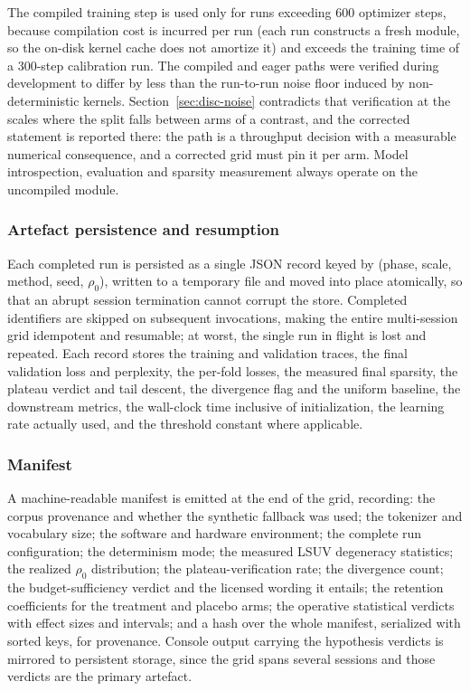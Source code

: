 \documentclass[final,5p,times,twocolumn]{elsarticle}
\theoremstyle{remark}
\newcommand{\rhoz}{\rho_{0}}
\begin{document}
The compiled training step is used only for runs exceeding $600$ optimizer
steps, because compilation cost is incurred per run (each run constructs a
fresh module, so the on-disk kernel cache does not amortize it) and exceeds the
training time of a $300$-step calibration run. The compiled and eager paths were
verified during development to differ by less than the run-to-run noise
floor induced by non-deterministic kernels. Section~\ref{sec:disc-noise}
contradicts that verification at the scales where the split falls between arms
of a contrast, and the corrected statement is reported there: the path is a
throughput decision with a measurable numerical consequence, and a corrected
grid must pin it per arm. Model introspection, evaluation and sparsity measurement always
operate on the uncompiled module.

\subsubsection{Artefact persistence and resumption}

Each completed run is persisted as a single JSON record keyed by
(phase, scale, method, seed, $\rhoz$), written to a temporary file and moved
into place atomically, so that an abrupt session termination cannot corrupt the
store. Completed identifiers are skipped on subsequent invocations, making the
entire multi-session grid idempotent and resumable; at worst, the single run in
flight is lost and repeated. Each record stores the training and validation
traces, the final validation loss and perplexity, the per-fold losses, the
measured final sparsity, the plateau verdict and tail descent, the divergence
flag and the uniform baseline, the downstream metrics, the wall-clock time
inclusive of initialization, the learning rate actually used, and the threshold
constant where applicable.

\subsubsection{Manifest}

A machine-readable manifest is emitted at the end of the grid, recording: the
corpus provenance and whether the synthetic fallback was used; the tokenizer and
vocabulary size; the software and hardware environment; the complete run
configuration; the determinism mode; the measured LSUV degeneracy statistics;
the realized $\rhoz$ distribution; the plateau-verification rate; the divergence
count; the budget-sufficiency verdict and the licensed wording it entails; the
retention coefficients for the treatment and placebo arms; the operative
statistical verdicts with effect sizes and intervals; and a hash over the
whole manifest, serialized with sorted keys, for provenance. Console output carrying the hypothesis
verdicts is mirrored to persistent storage, since the grid spans several
sessions and those verdicts are the primary artefact.
\end{document}
